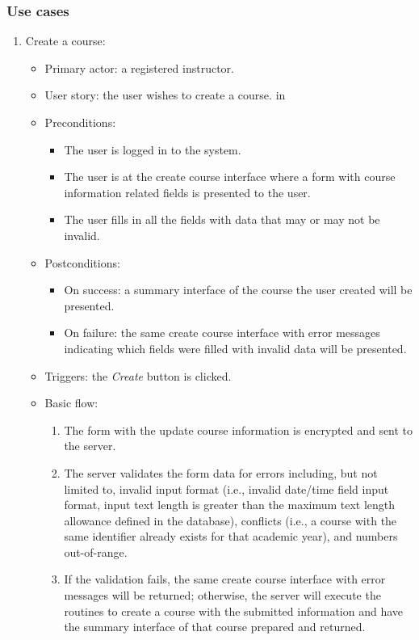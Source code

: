 \subsubsection{Use cases}
\begin{enumerate}
\item Create a course:
\begin{itemize}
    \item Primary actor: a registered instructor.
    \item User story: the user wishes to create a course.
     in
    \item Preconditions: 
        \begin{itemize}
            \item The user is logged in to the system.
            \item The user is at the create course interface where a form with
                course information related fields 
                is presented to the user.
            \item The user fills in all the fields with data that may or
                may not be invalid.
        \end{itemize}
    \item Postconditions:
        \begin{itemize}
            \item On success: a summary interface of the course the user created
                will be presented.
            \item On failure: the same create course interface with error
                messages indicating which fields were filled with invalid data
                will be presented.
        \end{itemize}
    \item Triggers: the \emph{Create} button is clicked.
    \item Basic flow:
        \begin{enumerate}
            \item The form with the update course information is encrypted and
                sent to the server.
            \item The server validates the form data for errors including,
                but not limited to,
                invalid input format
                (i.e., invalid date/time field input format,
                input text length is greater than the maximum text length
                allowance defined in the database),
                conflicts (i.e., a course with the same identifier  
                already exists for that academic year),
                and numbers out-of-range.
            \item If the validation fails, the same create course interface
                with error messages will be returned; otherwise, the server will
                execute the routines to create a course with the submitted 
                information and have the summary interface of that course prepared
                and returned.
        \end{enumerate}
\end{itemize}


\end{enumerate}
